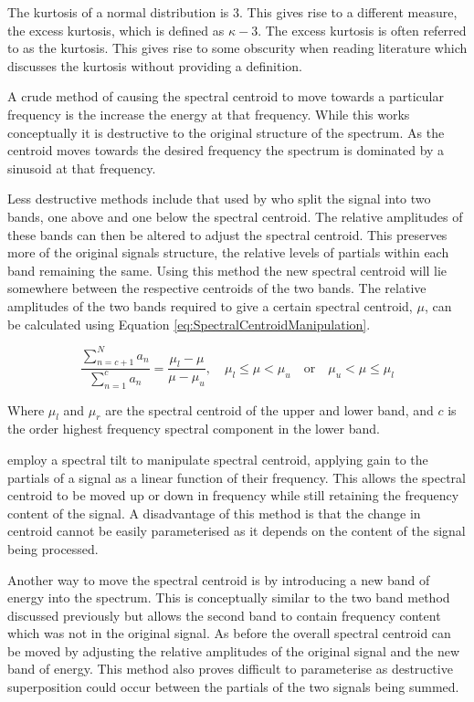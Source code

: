 		The kurtosis of a normal distribution is 3. This gives rise to a different measure, the excess kurtosis,
		which is defined as $\kappa - 3$. The excess kurtosis is often referred to as the kurtosis. This gives rise
		to some obscurity when reading literature which discusses the kurtosis without providing a definition.

		A crude method of causing the spectral centroid to move towards a particular frequency is the increase the
		energy at that frequency. While this works conceptually it is destructive to the original structure of the
		spectrum. As the centroid moves towards the desired frequency the spectrum is dominated by a sinusoid at
		that frequency.

		Less destructive methods include that used by \citet{zacharakis2011an} who split the signal into two bands,
		one above and one below the spectral centroid. The relative amplitudes of these bands can then be altered
		to adjust the spectral centroid. This preserves more of the original signals structure, the relative levels
		of partials within each band remaining the same. Using this method the new spectral centroid will lie
		somewhere between the respective centroids of the two bands. The relative amplitudes of the two bands
		required to give a certain spectral centroid, $\mu$, can be calculated using Equation
		\ref{eq:SpectralCentroidManipulation}.

		\begin{equation}
			\frac{\sum_{n = c + 1}^{N} a_{n}}
			     {{\sum_{n = 1}^{c} a_{n}}} = 
			\frac{\mu_{l} - \mu}{\mu - \mu_{u}}, 
			\quad \mu_{l} \leq \mu < \mu_{u} \quad \textrm{or} \quad \mu_{u} < \mu \leq \mu_{l}
			\label{eq:SpectralCentroidManipulation}
		\end{equation}

		Where $\mu_{l}$ and $\mu_{r}$ are the spectral centroid of the upper and lower band, and $c$ is the order
		highest frequency spectral component in the lower band.

		\citet{williams2007perceptually} employ a spectral tilt to manipulate spectral centroid, applying gain to
		the partials of a signal as a linear function of their frequency. This allows the spectral centroid to be
		moved up or down in frequency while still retaining the frequency content of the signal. A disadvantage of
		this method is that the change in centroid cannot be easily parameterised as it depends on the content of
		the signal being processed.

		Another way to move the spectral centroid is by introducing a new band of energy into the spectrum.  This
		is conceptually similar to the two band method discussed previously but allows the second band to contain
		frequency content which was not in the original signal. As before the overall spectral centroid can be
		moved by adjusting the relative amplitudes of the original signal and the new band of energy. This method
		also proves difficult to parameterise as destructive superposition could occur between the partials of the
		two signals being summed.


